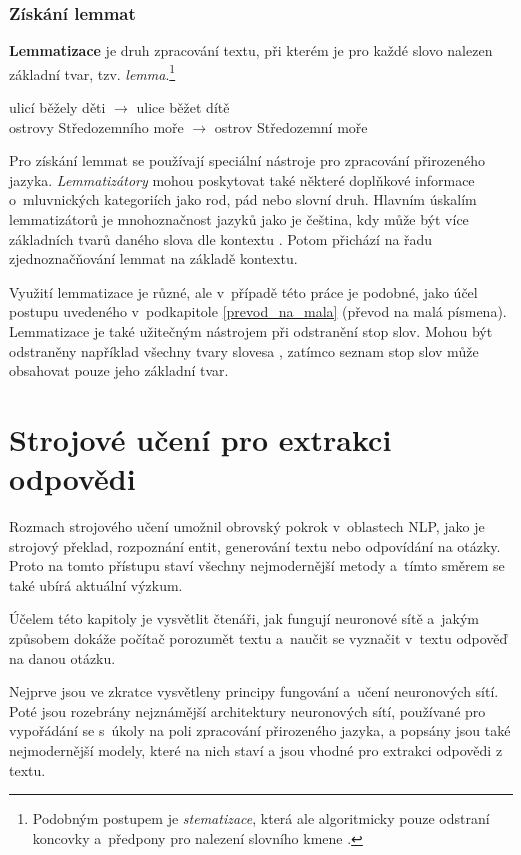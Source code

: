 \subsection{Získání lemmat}
\textbf{Lemmatizace} je druh zpracování textu, při kterém je pro každé slovo nalezen základní tvar, tzv. \emph{lemma}.\footnote{Podobným postupem je \emph{stematizace}, která ale algoritmicky pouze odstraní koncovky a~předpony pro nalezení slovního kmene \cite{information_retrieval}.}
\begin{center}
    ulicí běžely děti $\longrightarrow$ ulice běžet dítě\\
    ostrovy Středozemního moře $\longrightarrow$ ostrov Středozemní moře
\end{center}
Pro získání lemmat se používají speciální nástroje pro zpracování přirozeného jazyka. \emph{Lemma\-tizátory} mohou poskytovat také některé doplňkové informace o~mluvnických kategoriích jako rod, pád nebo slovní druh. Hlavním úskalím lemmatizátorů je mnohoznačnost jazyků jako je čeština, kdy může být více základních tvarů daného slova dle kontextu \cite{information_retrieval}. Potom přichází na řadu zjednoznačňování lemmat na základě kontextu.\par
Využití lemmatizace je různé, ale v~případě této práce je podobné, jako účel postupu uvedeného v~podkapitole \ref{prevod_na_mala} (převod na malá písmena). Lemmatizace je také užitečným nástrojem při odstranění stop slov. Mohou být odstraněny například všechny tvary slovesa , zatímco seznam stop slov může obsahovat pouze jeho základní tvar.



\chapter{Strojové učení pro extrakci odpovědi}
\label{language_comprehension}

Rozmach strojového učení umožnil obrovský pokrok v~oblastech NLP, jako je strojový překlad, rozpoznání entit, generování textu nebo odpovídání na otázky. Proto na tomto přístupu staví všechny nejmodernější metody a~tímto směrem se také ubírá aktuální výzkum.\par
Účelem této kapitoly je vysvětlit čtenáři, jak fungují neuronové sítě a~jakým způsobem dokáže počítač porozumět textu a~naučit se vyznačit v~textu odpověď na danou otázku.\par
Nejprve jsou ve zkratce vysvětleny principy fungování a~učení neuronových sítí. Poté jsou rozebrány nejznámější architektury neuronových sítí, používané pro vypořádání se s~úkoly na poli zpracování přirozeného jazyka, a popsány jsou také nejmodernější modely, které na nich staví a jsou vhodné pro extrakci odpovědi z textu.
\bigskip

